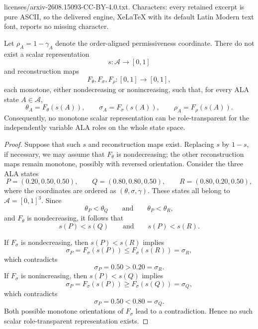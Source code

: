 \documentclass[10pt,a4paper]{amsart}
\providecommand{\cA}{\mathcal{A}}
\begin{document}
licenses/arxiv-2608.15093-CC-BY-4.0.txt. Characters: every retained excerpt is pure ASCII, so the delivered engine, XeLaTeX with its default Latin Modern text font, reports no missing character.
\begin{proposition}
\label{prop:no-monotone-scalar-role-transparent}
Let \(\rho_A=1-\gamma_A\) denote the order-aligned permissiveness coordinate.
There do not exist a scalar representation
\[
s:\cA\to[0,1]
\]
and reconstruction maps
\[
F_\theta,F_\sigma,F_\rho:[0,1]\to[0,1],
\]
each monotone, either nondecreasing or nonincreasing, such that, for every
ALA state \(A\in\cA\),
\[
\theta_A=F_\theta(s(A)),\qquad
\sigma_A=F_\sigma(s(A)),\qquad
\rho_A=F_\rho(s(A)).
\]
Consequently, no monotone scalar representation can be role-transparent for
the independently variable ALA roles on the whole state space.
\end{proposition}

\begin{proof}
Suppose that such \(s\) and reconstruction maps exist. Replacing \(s\) by
\(1-s\), if necessary, we may assume that \(F_\theta\) is nondecreasing; the
other reconstruction maps remain monotone, possibly with reversed
orientation. Consider the three ALA states
\[
P=(0.20,0.50,0.50),\qquad
Q=(0.80,0.80,0.50),\qquad
R=(0.80,0.20,0.50),
\]
where the coordinates are ordered as \((\theta,\sigma,\gamma)\). These
states all belong to \(\cA=[0,1]^3\). Since
\[
\theta_P<\theta_Q
\qquad\text{and}\qquad
\theta_P<\theta_R,
\]
and \(F_\theta\) is nondecreasing, it follows that
\[
s(P)<s(Q)
\qquad\text{and}\qquad
s(P)<s(R).
\]

If \(F_\sigma\) is nondecreasing, then \(s(P)<s(R)\) implies
\[
\sigma_P=F_\sigma(s(P))\le F_\sigma(s(R))=\sigma_R,
\]
which contradicts
\[
\sigma_P=0.50>0.20=\sigma_R.
\]
If \(F_\sigma\) is nonincreasing, then \(s(P)<s(Q)\) implies
\[
\sigma_P=F_\sigma(s(P))\ge F_\sigma(s(Q))=\sigma_Q,
\]
which contradicts
\[
\sigma_P=0.50<0.80=\sigma_Q.
\]
Both possible monotone orientations of \(F_\sigma\) lead to a contradiction.
Hence no such scalar role-transparent representation exists.
\end{proof}
\end{document}

